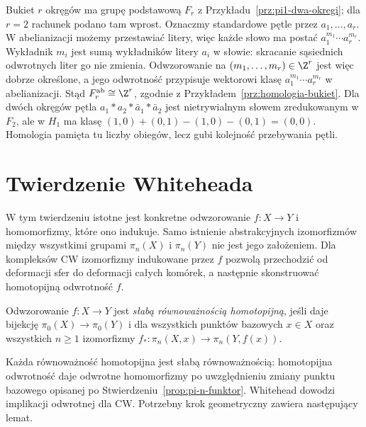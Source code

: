 \begin{przyklad}
Bukiet $r$ okręgów ma grupę podstawową $F_r$
z Przykładu~\ref{prz:pi1-dwa-okregi}; dla $r=2$ rachunek
podano tam wprost. Oznaczmy standardowe pętle przez
$a_1,\ldots,a_r$. W abelianizacji możemy przestawiać litery,
więc każde słowo ma postać $a_1^{m_1}\cdots a_r^{m_r}$.
Wykładnik $m_i$ jest sumą wykładników litery $a_i$ w słowie:
skracanie sąsiednich odwrotnych liter go nie zmienia.
Odwzorowanie na $(m_1,\ldots,m_r)\in\Z^r$ jest więc dobrze
określone, a jego odwrotność przypisuje wektorowi klasę
$a_1^{m_1}\cdots a_r^{m_r}$ w abelianizacji.
Stąd $F_r^{\mathrm{ab}}\cong\Z^r$, zgodnie z
Przykładem~\ref{prz:homologia-bukiet}.
Dla dwóch okręgów pętla $a_1*a_2*\bar a_1*\bar a_2$
jest nietrywialnym słowem zredukowanym w $F_2$, ale w $H_1$
ma klasę $(1,0)+(0,1)-(1,0)-(0,1)=(0,0)$.
Homologia pamięta tu liczby obiegów, lecz gubi kolejność
przebywania pętli.
\end{przyklad}

\section{Twierdzenie Whiteheada}
\label{sec:whitehead}

W tym twierdzeniu istotne jest konkretne odwzorowanie
$f:X\to Y$ i homomorfizmy, które ono indukuje.
Samo istnienie abstrakcyjnych izomorfizmów między wszystkimi
grupami $\pi_n(X)$ i $\pi_n(Y)$ nie jest jego założeniem.
Dla kompleksów CW izomorfizmy indukowane przez $f$ pozwolą
przechodzić od deformacji sfer do deformacji całych komórek,
a następnie skonstruować homotopijną odwrotność $f$.

\begin{definicja}
\label{def:slaba-rownowaznosc}
Odwzorowanie $f:X\to Y$ jest \emph{słabą równoważnością homotopijną},
jeśli daje bijekcję $\pi_0(X)\to\pi_0(Y)$ i dla wszystkich punktów
bazowych $x\in X$ oraz wszystkich $n\geq1$ izomorfizmy
$f_*:\pi_n(X,x)\to\pi_n(Y,f(x))$.
\end{definicja}

Każda równoważność homotopijna jest słabą równoważnością:
homotopijna odwrotność daje odwrotne homomorfizmy po uwzględnieniu
zmiany punktu bazowego opisanej po
Stwierdzeniu~\ref{prop:pi-n-funktor}.
Whitehead dowodzi implikacji odwrotnej dla CW.
Potrzebny krok geometryczny zawiera następujący lemat.

